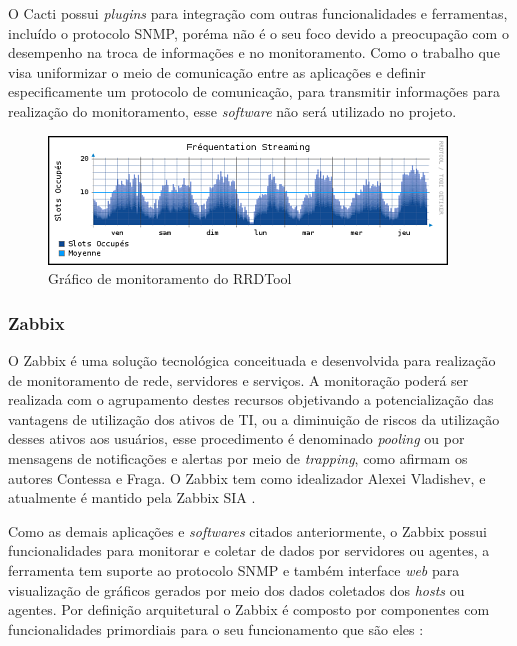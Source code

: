 O Cacti possui \textit{plugins} para integração com outras funcionalidades e ferramentas, incluído o protocolo \acrshort{SNMP}, poréma não é o seu foco devido a preocupação com o desempenho na troca de informações e no monitoramento. Como o trabalho que visa uniformizar o meio de comunicação entre as aplicações e definir especificamente um protocolo de comunicação, para transmitir informações para realização do monitoramento, esse \textit{software} não será utilizado no projeto.

\begin{figure}[H]
	\begin{center}
	\includegraphics[scale = 0.50]{img/stream-pop.png}
		\caption{Gráfico de monitoramento do RRDTool \cite{rrdtool}}
		\label{fun:fig:rrdtool}
	\end{center}
\end{figure}


\subsubsection{Zabbix}

O Zabbix é uma solução tecnológica conceituada e desenvolvida para realização de monitoramento de rede, servidores e serviços. A monitoração poderá ser realizada com o agrupamento destes recursos objetivando a potencialização das vantagens de utilização dos ativos de TI, ou a diminuição de riscos da utilização desses ativos aos usuários, esse procedimento é denominado \textit{pooling} ou por mensagens de notificações e alertas por meio de \textit{trapping}, como afirmam os autores Contessa e Fraga\cite{contessa2010gerenciamento}. O Zabbix tem como idealizador  Alexei Vladishev, e atualmente é mantido pela Zabbix SIA \cite{zabbix}.   

Como as demais aplicações e \textit{softwares} citados anteriormente, o Zabbix possui funcionalidades para monitorar e coletar de dados por servidores ou agentes, a ferramenta tem suporte ao protocolo \acrshort{SNMP} e também interface \textit{web} para visualização de gráficos gerados por meio dos dados coletados dos \textit{hosts} ou agentes. Por definição arquitetural o Zabbix é composto por componentes com funcionalidades primordiais para o seu funcionamento que são eles \cite{zabbix}: 

